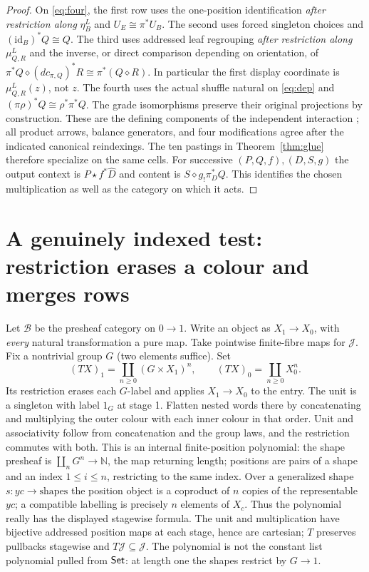 \documentclass[11pt]{article}
\theoremstyle{definition}\newtheorem{definition}[theorem]{Definition}
\newcommand{\B}{\mathcal B}\newcommand{\J}{\mathcal J}
\newcommand{\id}{\mathrm{id}}\newcommand{\op}{\mathrm{op}}\newcommand{\dom}{\mathrm{dom}}
\newcommand{\st}{\mathbin{\star}}\newcommand{\bx}{\mathop{\boxtimes}}
\begin{document}
\begin{proof}
On \eqref{eq:four}, the first row uses the one-position identification
\emph{after restriction along} $\eta^L_B$ and $U_E\cong\pi^*U_B$.
The second uses forced singleton choices and $(\id_B)^*Q\cong Q$.
The third uses addressed leaf regrouping \emph{after restriction along}
$\mu^L_{Q,R}$ and the inverse, or direct comparison depending on
orientation, of
$\pi^*Q\diamond(dc_{\pi,Q})^*R\cong\pi^*(Q\diamond R)$.
In particular the first display coordinate is $\mu^L_{Q,R}(z)$,
not $z$. The fourth uses the actual shuffle natural on
\eqref{eq:dep} and $(\pi\rho)^*Q\cong\rho^*\pi^*Q$. The grade
isomorphisms preserve their original projections by construction.
These are the defining components of the independent interaction
\cite[Secs.~4--5]{O1}; all product arrows, balance generators, and
four modifications agree after the indicated canonical reindexings.
The ten pastings in Theorem~\ref{thm:glue} therefore specialize on
the same cells. For successive $(P,Q,f),(D,S,g)$ the output context
is $P\st f^*\widehat D$ and content is $S\diamond g_!\pi_D^*Q$.
This identifies the chosen multiplication as well as the category
on which it acts.
\end{proof}

\section{A genuinely indexed test: restriction erases a colour and merges rows}
\label{sec:diagram}
Let $\B$ be the presheaf category on $0\to1$. Write an object as
$X_1\to X_0$, with \emph{every} natural transformation a pure map.
Take pointwise finite-fibre maps for $\J$. Fix a nontrivial group
$G$ (two elements suffice). Set
\[
 (TX)_1=\coprod_{n\ge0}(G\times X_1)^n,\qquad
 (TX)_0=\coprod_{n\ge0} X_0^n.
\]
Its restriction erases each $G$-label and applies $X_1\to X_0$ to
the entry. The unit is a singleton with label $1_G$ at stage 1.
Flatten nested words there by concatenating and multiplying the
outer colour with each inner colour in that order. Unit and
associativity follow from concatenation and the group laws, and the
restriction commutes with both. This is an internal finite-position
polynomial: the shape presheaf is
$\coprod_nG^n\to\mathbb N$, the map returning length; positions are
pairs of a shape and an index $1\le i\le n$, restricting to the
same index. Over a generalized shape $s:y c\to\text{shapes}$ the
position object is a coproduct of $n$ copies of the representable
$yc$; a compatible labelling is precisely $n$ elements of $X_c$.
Thus the polynomial really has the displayed stagewise formula.
The unit and multiplication have bijective addressed position maps
at each stage, hence are cartesian; $T$ preserves pullbacks
stagewise and $T\J\subseteq\J$. The polynomial is not the constant
list polynomial pulled from $\mathsf{Set}$: at length one the shapes restrict
by $G\to1$.
\end{document}
